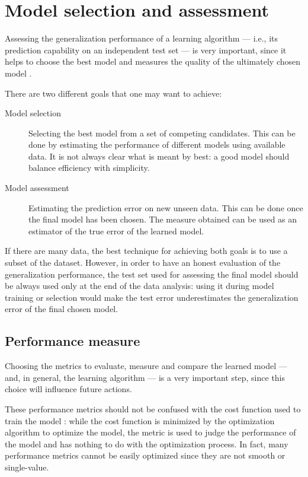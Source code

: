     \section{Model selection and assessment}
        Assessing the generalization performance of a learning algorithm --- i.e., its prediction capability on an independent test set --- is very important, since it helps to choose the best model and measures the quality of the ultimately chosen model \cite[219]{Hastie}.
        
        There are two different goals that one may want to achieve:
        \begin{description}
            \item[Model selection] Selecting the best model from a set of competing candidates. This can be done by estimating the performance of different models using available data. It is not always clear what is meant by best: a good model should balance efficiency with simplicity.
            \item[Model assessment] Estimating the prediction error on new unseen data. This can be done once the final model has been chosen. The measure obtained can be used as an estimator of the true error of the learned model.
        \end{description}
        If there are many data, the best technique for achieving both goals is to use a subset of the dataset. However, in order to have an honest evaluation of the generalization performance, the test set used for assessing the final model should be always used only at the end of the data analysis: using it during model training or selection would make the test error underestimates the generalization error of the final chosen model.
        \subsection{Performance measure}
            Choosing the metrics to evaluate, measure and compare the learned model --- and, in general, the learning algorithm --- is a very important step, since this choice will influence future actions. 
            
            These performance metrics should not be confused with the cost function used to train the model \cite[423]{Goodfellow}: while the cost function is minimized by the optimization algorithm to optimize the model, the metric is used to judge the performance of the model and has nothing to do with the optimization process. In fact, many performance metrics cannot be easily optimized since they are not smooth or single-value.
            
